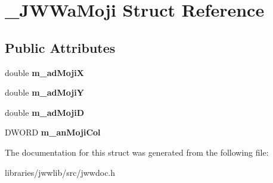 \hypertarget{struct__JWWaMoji}{\section{\-\_\-\-J\-W\-Wa\-Moji Struct Reference}
\label{struct__JWWaMoji}
}
\subsection*{Public Attributes}
\begin{DoxyCompactItemize}
\item 
\hypertarget{struct__JWWaMoji_ac9a2f1c4df0cc1e3ec75b9012cf3bf1b}{double {\bfseries m\-\_\-ad\-Moji\-X}}\label{struct__JWWaMoji_ac9a2f1c4df0cc1e3ec75b9012cf3bf1b}

\item 
\hypertarget{struct__JWWaMoji_a187f088c3b37da742e92eacb7c5ef769}{double {\bfseries m\-\_\-ad\-Moji\-Y}}\label{struct__JWWaMoji_a187f088c3b37da742e92eacb7c5ef769}

\item 
\hypertarget{struct__JWWaMoji_a2a1f7ef7234579e7432b4dd710720253}{double {\bfseries m\-\_\-ad\-Moji\-D}}\label{struct__JWWaMoji_a2a1f7ef7234579e7432b4dd710720253}

\item 
\hypertarget{struct__JWWaMoji_a0a1e9170df24aa6dca721a4a70743635}{D\-W\-O\-R\-D {\bfseries m\-\_\-an\-Moji\-Col}}\label{struct__JWWaMoji_a0a1e9170df24aa6dca721a4a70743635}

\end{DoxyCompactItemize}


The documentation for this struct was generated from the following file\-:\begin{DoxyCompactItemize}
\item 
libraries/jwwlib/src/jwwdoc.\-h\end{DoxyCompactItemize}
